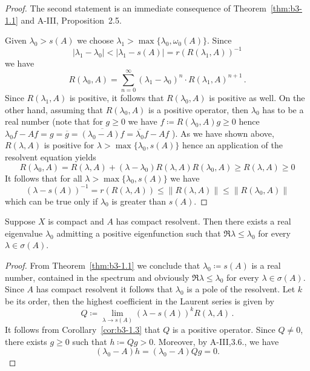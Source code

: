 \begin{proof}
	The second statement is an immediate consequence of Theorem~\ref{thm:b3-1.1} and A-III, Proposition~2.5.
	
	Given $\lambda_0 > s(A)$ we choose $\lambda_1 > \max\{\lambda_0,\omega_{0}(A)\}$.
	Since 
	\[
	\text{$|\lambda_1 - \lambda_0| < |\lambda_1 - s(A)| = r(R(\lambda_1,A))^{-1}$}
	\]
	we have
	\begin{equation}\label{eq:b3-1.10}
		R(\lambda_0,A) = \sum_{n=0}^{\infty} (\lambda_1 - \lambda_0)^n \cdot R(\lambda_1,A)^{n+1}\,.
	\end{equation}
	Since $R(\lambda_1,A)$ is positive, it follows that $R(\lambda_0,A)$ is positive as well.
	On the other hand, assuming that $R(\lambda_0,A)$ is a positive operator, then $\lambda_0$ has to be a real number (note that for $g \geq 0$ we have $f \coloneqq R(\lambda_0,A)g \geq 0$ hence $\lambda_0f - Af = g = \overline{g} = \overline{(\lambda_0 - A)f} = \overline{\lambda_0}f - Af$ ).
	As we have shown above, $R(\lambda,A)$ is positive for $\lambda > \max\{\lambda_0,s(A)\}$ hence an application of the resolvent equation yields
	\begin{equation}\label{eq:b3-1.11}
		R(\lambda_0,A) = R(\lambda,A) + (\lambda - \lambda_0)R(\lambda,A)R(\lambda_0,A) \geq R(\lambda,A) \geq 0
	\end{equation}
	It follows that for all $\lambda > \max\{\lambda_{0},s(A)\}$ we have
	\begin{equation}\label{eq:b3-1.12}
		(\lambda - s(A))^{-1} = r(R(\lambda,A)) \leq \|R(\lambda,A)\| \leq \|R(\lambda_{0},A)\|
	\end{equation}
	which can be true only if $\lambda_{0}$ is greater than $s(A)$.
\end{proof}
\begin{corollary}\label{cor:b3-1.4}
Suppose $X$ is compact and $A$ has compact resolvent.	
	Then there exists a real eigenvalue $\lambda_{0}$ admitting a positive eigenfunction such that 
	$\Re\lambda \leq \lambda_{0}$ for every $\lambda \in \sigma(A)$.
\end{corollary}
\begin{proof}
	From Theorem~\ref{thm:b3-1.1} we conclude that $\lambda_{0} \coloneqq s(A)$ is a real number, contained in the spectrum and obviously $\Re\lambda \leq \lambda_{0}$ for every $\lambda \in \sigma(A)$.
	Since $A$ has compact resolvent it follows that $\lambda_{0}$ is a pole of the resolvent.
	Let $k$ be its order, then the highest coefficient in the Laurent series is given by
	\begin{equation}\label{eq:b3-1.13}
		Q \coloneqq \lim_{\lambda \to s(A)} (\lambda - s(A))^{k}R(\lambda,A)\,.
	\end{equation}
It follows from Corollary~\ref{cor:b3-1.3} that $Q$ is a positive operator.
Since $Q \neq 0$, there exists $g \geq 0$ such that $h \coloneqq Qg > 0$.
Moreover, by A-III,3.6., we have 
%
\[
	 (\lambda_{0} - A)h = (\lambda_{0} - A)Qg = 0 .
\]
%
\end{proof}
